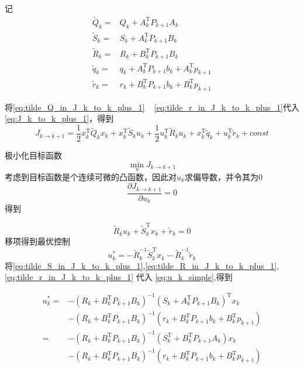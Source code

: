 \documentclass[withoutpreface,bwprint]{NoteBook}
\begin{document}
记
\begin{align}
\label{eq:tilde_Q_in_J_k_to_k_plus_1}
\tilde{Q}_k =& Q_k + A_k^\mathrm{T}P_{k+1}A_k  \\

\label{eq:tilde_S_in_J_k_to_k_plus_1} 
\tilde{S}_k =& S_k + A_k^\mathrm{T}P_{k+1}B_k \\

\label{eq:tilde_R_in_J_k_to_k_plus_1}
\tilde{R}_k =& R_k + B_k^\mathrm{T}P_{k+1}B_k \\

\label{eq:tilde_q_in_J_k_to_k_plus_1}
\tilde{q}_k =& q_k + A_k^\mathrm{T}P_{k+1}b_k+ A_k^\mathrm{T} p_{k+1} \\

\label{eq:tilde_r_in_J_k_to_k_plus_1}
\tilde{r}_k =& r_k + B_{k}^\mathrm{T}P_{k+1}b_{k} + B_{k}^\mathrm{T}p_{k+1} 
\end{align}

将\cref{eq:tilde_Q_in_J_k_to_k_plus_1} ~ \cref{eq:tilde_r_in_J_k_to_k_plus_1}代入 \cref{eq:J_k_to_k_plus_1}，得到
\begin{equation}
\label{eq:J_k_to_k+1_simple}
J_{k\rightarrow k+1}
= \frac{1}{2}x_k^\mathrm{T} \tilde{Q}_k x_k
+ x_k^\mathrm{T} \tilde{S}_k u_k 
+ \frac{1}{2}u_k^\mathrm{T} \tilde{R}_k u_k 
+ x_k^\mathrm{T} \tilde{q}_k 
+ u_k^\mathrm{T} \tilde{r}_k 
+ const
\end{equation}

极小化目标函数
$$
\min_u J_{k\rightarrow k+1}
$$
考虑到目标函数是个连续可微的凸函数，因此对$u_k$求偏导数，并令其为0
$$
\frac{\partial J_{k\rightarrow k+1}}{\partial u_k} = 0
$$
得到

\begin{equation}
\label{eq:partial_u_k_for_J_k_to_k_plus_1}
\tilde{R}_k u_k
+ \tilde{S}_k^\mathrm{T} x_k 
+ \tilde{r}_k 
=0
\end{equation}
移项得到最优控制
\begin{equation}
\label{eq:u_k_simple}
u_k^* = - \tilde{R}_k^{-1} \tilde{S}_k^\mathrm{T} x_k 
- \tilde{R}_k^{-1} \tilde{r}_k 
\end{equation}
将\cref{eq:tilde_S_in_J_k_to_k_plus_1},\cref{eq:tilde_R_in_J_k_to_k_plus_1},\cref{eq:tilde_r_in_J_k_to_k_plus_1} 代入 \cref{eq:u_k_simple},得到

\begin{align}
\label{eq:u_k_star}
u_k^*
=& - \left(R_k + B_k^\mathrm{T}P_{k+1}B_k \right)^{-1} \left( S_k + A_k^\mathrm{T}P_{k+1}B_k \right)^\mathrm{T} x_k \nonumber \\
 & - \left(R_k + B_k^\mathrm{T}P_{k+1}B_k \right)^{-1} \left(r_k + B_{k}^\mathrm{T}P_{k+1}b_{k} +B_{k}^\mathrm{T}p_{k+1} \right)  \nonumber \\
 
 =& - \left(R_k + B_k^\mathrm{T}P_{k+1}B_k \right)^{-1} \left( S_k^\mathrm{T} + B_k^\mathrm{T}P_{k+1}A_k \right) x_k \nonumber \\
 & - \left(R_k + B_k^\mathrm{T}P_{k+1}B_k \right)^{-1} \left(r_k + B_{k}^\mathrm{T}P_{k+1}b_{k} 
+ B_{k}^\mathrm{T}p_{k+1} \right)
\end{align}
\end{document}
